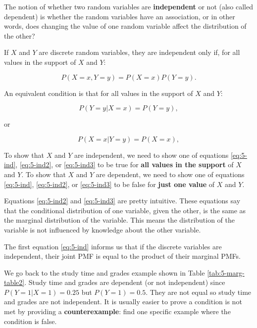 \documentclass[
]{book}
\begin{document}
The notion of whether two random variables are \textbf{independent} or not (also called dependent) is whether the random variables have an association, or in other words, does changing the value of one random variable affect the distribution of the other?

If \(X\) and \(Y\) are discrete random variables, they are independent only if, for all values in the support of \(X\) and \(Y\):

\begin{equation} 
P(X=x, Y=y) = P(X=x) P(Y=y).
\label{eq:5-ind}
\end{equation}

An equivalent condition is that for all values in the support of \(X\) and \(Y\):

\begin{equation} 
P(Y=y | X=x) = P(Y=y),
\label{eq:5-ind2}
\end{equation}

or

\begin{equation} 
P(X=x | Y=y) = P(X=x),
\label{eq:5-ind3}
\end{equation}

To show that \(X\) and \(Y\) are independent, we need to show one of equations \eqref{eq:5-ind}, \eqref{eq:5-ind2}, or \eqref{eq:5-ind3} to be true for \textbf{all values in the support} of \(X\) and \(Y\). To show that \(X\) and \(Y\) are dependent, we need to show one of equations \eqref{eq:5-ind}, \eqref{eq:5-ind2}, or \eqref{eq:5-ind3} to be false for \textbf{just one value} of \(X\) and \(Y\).

Equations \eqref{eq:5-ind2} and \eqref{eq:5-ind3} are pretty intuitive. These equations say that the conditional distribution of one variable, given the other, is the same as the marginal distribution of the variable. This means the distribution of the variable is not influenced by knowledge about the other variable.

The first equation \eqref{eq:5-ind} informs us that if the discrete variables are independent, their joint PMF is equal to the product of their marginal PMFs.

We go back to the study time and grades example shown in Table \ref{tab:5-marg-table2}. Study time and grades are dependent (or not independent) since \(P(Y=1|X=1) = 0.25\) but \(P(Y=1) = 0.5\). They are not equal so study time and grades are not independent. It is usually easier to prove a condition is not met by providing a \textbf{counterexample}: find one specific example where the condition is false.
\end{document}
